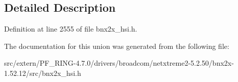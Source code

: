 \subsection{Detailed Description}


Definition at line 2555 of file bnx2x\_\-hsi.h.



The documentation for this union was generated from the following file:\begin{DoxyCompactItemize}
\item 
src/extern/PF\_\-RING-\/4.7.0/drivers/broadcom/netxtreme2-\/5.2.50/bnx2x-\/1.52.12/src/bnx2x\_\-hsi.h\end{DoxyCompactItemize}
